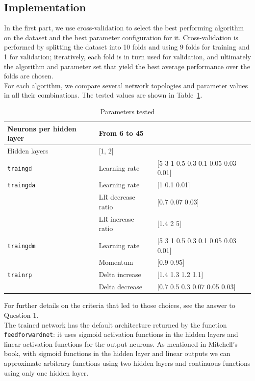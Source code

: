 \documentclass{article}
\begin{document}
\subsection{Implementation}
In the first part, we use cross-validation to select the best performing algorithm on the dataset and the best parameter configuration for it. Cross-validation is performed by splitting the dataset into 10 folds and using 9 folds for training and 1 for validation; iteratively, each fold is in turn used for validation, and ultimately the algorithm and parameter set that yield the best average performance over the folds are chosen.\\
For each algorithm, we compare several network topologies and parameter values in all their combinations. The tested values are shown in Table~\ref{tab:parameters}.
\begin{table}
	\centering
	\caption{Parameters tested}
	\label{tab:parameters}

		\begin{tabular}{|l|l|l|}
		\hline
		Neurons per hidden layer & \multicolumn{2}{l|}{From 6 to 45} \\\hline
		Hidden layers		& \multicolumn{2}{l|}{[1, 2]} \\\hline
		\verb$traingd$	&	Learning rate		&	[5 3 1 0.5 0.3 0.1 0.05 0.03 0.01] \\\hline
		\verb$traingda$	&	Learning rate & [1 0.1 0.01] \\\cline{2-3}
										& LR decrease ratio	&	[0.7 0.07 0.03] \\\cline{2-3}
										& LR increase ratio & [1.4 2 5]	\\\hline
		\verb$traingdm$	&	Learning rate	&	[5 3 1 0.5 0.3 0.1 0.05 0.03 0.01]	\\\cline{2-3}
										&	Momentum			&	[0.9 0.95]	\\\hline
		\verb$trainrp$	&	Delta increase	&	[1.4 1.3 1.2 1.1]	\\\cline{2-3}
										&	Delta decrease	&	[0.7 0.5 0.3 0.07 0.05 0.03]	\\
		\hline		
		\end{tabular}
\end{table}
For further details on the criteria that led to those choices, see the answer to Question 1.\\
The trained network has the default architecture returned by the function \verb$feedforwardnet$: it uses sigmoid activation functions in the hidden layers and linear activation functions for the output neurons. As mentioned in Mitchell's book, with sigmoid functions in the hidden layer and linear outputs we can approximate arbitrary functions using two hidden layers and continuous functions using only one hidden layer.
\end{document}
